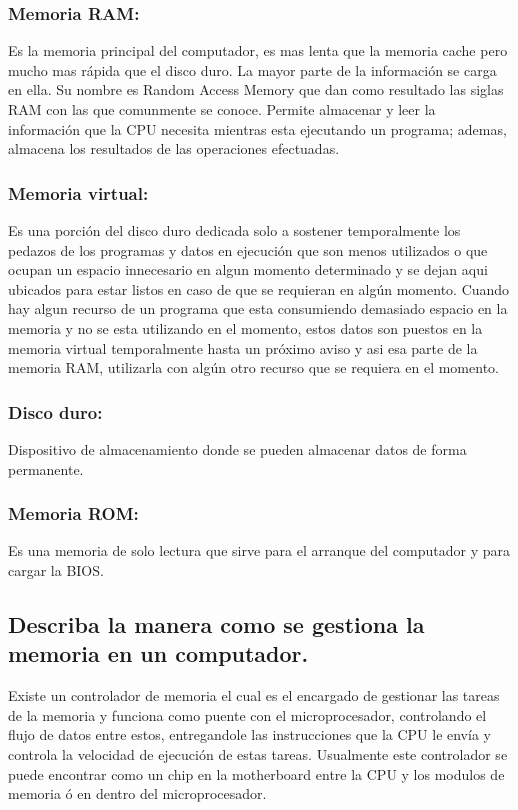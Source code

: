 \documentclass{article}
\begin{document}
\subsubsection{\textbf{Memoria RAM:}}
Es la memoria principal del computador, es mas lenta que la memoria cache pero mucho mas rápida que el disco duro. La mayor parte de la información se carga en ella. Su nombre es Random Access Memory que dan como resultado las siglas RAM con las que comunmente se conoce. \cite{augusto}
Permite almacenar y leer la información que la CPU necesita mientras esta ejecutando un programa; ademas, almacena los resultados de las operaciones efectuadas. \cite{ecured}
\subsubsection{\textbf{Memoria virtual:}}
Es una porción del disco duro dedicada solo a sostener temporalmente los pedazos de los programas y datos en ejecución que son menos utilizados o que ocupan un espacio innecesario en algun momento determinado y se dejan aqui ubicados para estar listos en caso de que se requieran en algún momento. Cuando hay algun recurso de un programa que esta consumiendo demasiado espacio en la memoria y no se esta utilizando en el momento, estos datos son puestos en la memoria virtual temporalmente hasta un próximo aviso y asi esa parte de la memoria RAM, utilizarla con algún otro recurso que se requiera en el momento.
\subsubsection{\textbf{Disco duro:}}
Dispositivo de almacenamiento donde se pueden almacenar datos de forma permanente. 
\subsubsection{\textbf{Memoria ROM:}}
Es una memoria de solo lectura que sirve para el arranque del computador y para cargar la BIOS.

    
\subsection{\textbf{Describa la manera como se gestiona la memoria en un computador.}}
Existe un controlador de memoria el cual es el encargado de gestionar las tareas de la memoria y funciona como puente con el microprocesador, controlando el flujo de datos entre estos, entregandole las instrucciones que la CPU le envía y controla la velocidad de ejecución de estas tareas. Usualmente este controlador se puede encontrar como un chip en la motherboard entre la CPU y los modulos de memoria ó en dentro del microprocesador. \cite{augusto}
\end{document}
